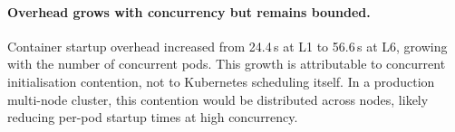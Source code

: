\paragraph{Overhead grows with concurrency but remains bounded.}
Container startup overhead increased from 24.4\,s at L1 to 56.6\,s at L6, growing with the number of concurrent pods.
This growth is attributable to concurrent initialisation contention, not to Kubernetes scheduling itself.
In a production multi-node cluster, this contention would be distributed across nodes, likely reducing per-pod startup times at high concurrency.


